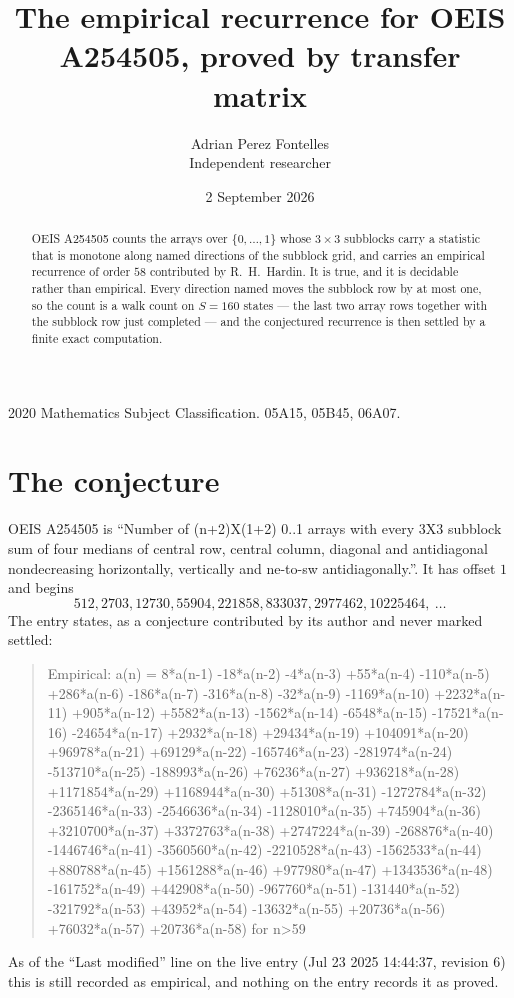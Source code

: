 \documentclass[11pt,a4paper]{article}
\title{The empirical recurrence for OEIS A254505, proved by transfer matrix}
\author{Adrian Perez Fontelles\\ \small Independent researcher}
\date{2 September 2026}
\theoremstyle{plain}
\theoremstyle{definition}
\begin{document}
\maketitle

\begin{abstract}
OEIS A254505 counts the arrays over $\{0,\dots,1\}$ whose $3\times3$ subblocks carry a
statistic that is monotone along named directions of the subblock grid, and carries an
empirical recurrence of order $58$ contributed by R.~H.~Hardin. It is true, and it is
decidable rather than empirical. Every direction named moves the subblock row by at most one,
so the count is a walk count on $S=160$ states --- the last two array rows together with the
subblock row just completed --- and the conjectured recurrence is then settled by a finite
exact computation.
\end{abstract}

\noindent\small 2020 Mathematics Subject Classification. 05A15, 05B45, 06A07.\normalsize

\section{The conjecture}

OEIS A254505 is ``Number of (n+2)X(1+2) 0..1 arrays with every 3X3 subblock sum of four medians of central row, central column, diagonal and antidiagonal nondecreasing horizontally, vertically and ne-to-sw antidiagonally.''. It has offset $1$ and begins
\[
512, 2703, 12730, 55904, 221858, 833037, 2977462, 10225464,\ \dots
\]
The entry states, as a conjecture contributed by its author and never marked settled:
\begin{quote}
Empirical: a(n) = 8*a(n-1) -18*a(n-2) -4*a(n-3) +55*a(n-4) -110*a(n-5) +286*a(n-6) -186*a(n-7) -316*a(n-8) -32*a(n-9) -1169*a(n-10) +2232*a(n-11) +905*a(n-12) +5582*a(n-13) -1562*a(n-14) -6548*a(n-15) -17521*a(n-16) -24654*a(n-17) +2932*a(n-18) +29434*a(n-19) +104091*a(n-20) +96978*a(n-21) +69129*a(n-22) -165746*a(n-23) -281974*a(n-24) -513710*a(n-25) -188993*a(n-26) +76236*a(n-27) +936218*a(n-28) +1171854*a(n-29) +1168944*a(n-30) +51308*a(n-31) -1272784*a(n-32) -2365146*a(n-33) -2546636*a(n-34) -1128010*a(n-35) +745904*a(n-36) +3210700*a(n-37) +3372763*a(n-38) +2747224*a(n-39) -268876*a(n-40) -1446746*a(n-41) -3560560*a(n-42) -2210528*a(n-43) -1562533*a(n-44) +880788*a(n-45) +1561288*a(n-46) +977980*a(n-47) +1343536*a(n-48) -161752*a(n-49) +442908*a(n-50) -967760*a(n-51) -131440*a(n-52) -321792*a(n-53) +43952*a(n-54) -13632*a(n-55) +20736*a(n-56) +76032*a(n-57) +20736*a(n-58) for n>59
\end{quote}
As of the ``Last modified'' line on the live entry (Jul 23 2025 14:44:37, revision 6) this is still
recorded as empirical, and nothing on the entry records it as proved.
\end{document}
